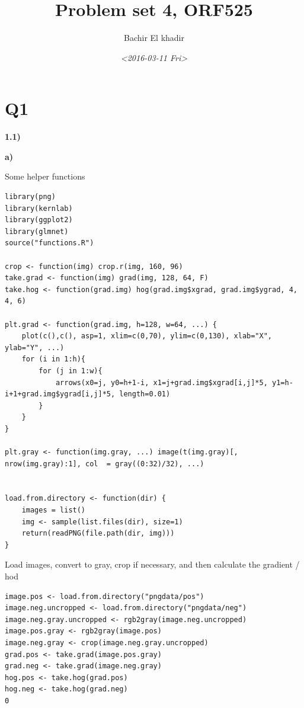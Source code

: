 \documentclass[11pt]{article}
\author{Bachir El khadir}
\date{\textit{<2016-03-11 Fri>}}
\title{Problem set 4, ORF525}
\begin{document}
\maketitle
\begin{HTML}

\label{orgspecialblock1}

\end{HTML}


\section{Q1}
\label{sec:orgheadline1}

\textbf{1.1)}

\textbf{a)}

Some helper functions
\begin{verbatim}
library(png)
library(kernlab)
library(ggplot2)
library(glmnet)
source("functions.R")

crop <- function(img) crop.r(img, 160, 96)
take.grad <- function(img) grad(img, 128, 64, F)
take.hog <- function(grad.img) hog(grad.img$xgrad, grad.img$ygrad, 4, 4, 6)

plt.grad <- function(grad.img, h=128, w=64, ...) {
    plot(c(),c(), asp=1, xlim=c(0,70), ylim=c(0,130), xlab="X", ylab="Y", ...)
    for (i in 1:h){
        for (j in 1:w){
            arrows(x0=j, y0=h+1-i, x1=j+grad.img$xgrad[i,j]*5, y1=h-i+1+grad.img$ygrad[i,j]*5, length=0.01)
        }
    }
}

plt.gray <- function(img.gray, ...) image(t(img.gray)[, nrow(img.gray):1], col  = gray((0:32)/32), ...)


load.from.directory <- function(dir) {
    images = list()
    img <- sample(list.files(dir), size=1) 
    return(readPNG(file.path(dir, img)))
}
\end{verbatim}


Load images, convert to gray, crop if necessary, and then calculate the gradient / hod

\begin{verbatim}
image.pos <- load.from.directory("pngdata/pos")
image.neg.uncropped <- load.from.directory("pngdata/neg")
image.neg.gray.uncropped <- rgb2gray(image.neg.uncropped)
image.pos.gray <- rgb2gray(image.pos)
image.neg.gray <- crop(image.neg.gray.uncropped)
grad.pos <- take.grad(image.pos.gray)
grad.neg <- take.grad(image.neg.gray)
hog.pos <- take.hog(grad.pos)
hog.neg <- take.hog(grad.neg)
0
\end{verbatim}
\end{document}
